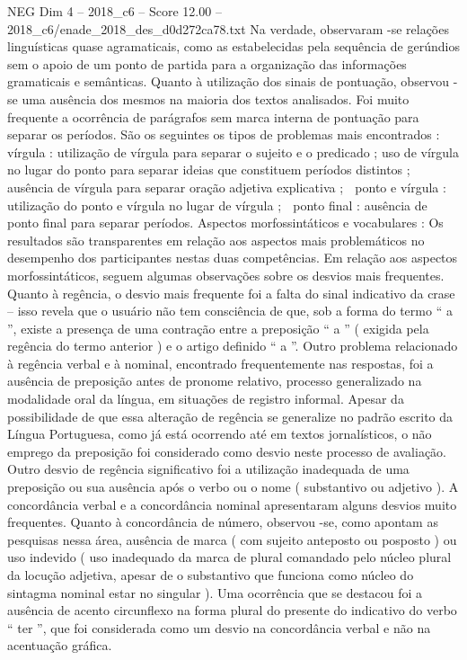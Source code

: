 \begin{textsample}{NEG Dim 4 – 2018\_c6 – Score 12.00 – 2018\_c6/enade\_2018\_des\_d0d272ca78.txt}
Na verdade, observaram -se relações linguísticas quase agramaticais, como as estabelecidas pela sequência de gerúndios sem o apoio de um ponto de partida para a organização das informações gramaticais e semânticas.
Quanto à utilização dos sinais de pontuação, observou -se uma ausência dos mesmos na maioria dos textos analisados.
Foi muito frequente a ocorrência de parágrafos sem marca interna de pontuação para separar os períodos.
São os seguintes os tipos de problemas mais encontrados :  vírgula : utilização de vírgula para separar o sujeito e o predicado ; uso de vírgula no lugar do ponto para separar ideias que constituem períodos distintos ; ausência de vírgula para separar oração adjetiva explicativa ;  ponto e vírgula : utilização do ponto e vírgula no lugar de vírgula ;  ponto final : ausência de ponto final para separar períodos.
Aspectos morfossintáticos e vocabulares : Os resultados são transparentes em relação aos aspectos mais problemáticos no desempenho dos participantes nestas duas competências.
Em relação aos aspectos morfossintáticos, seguem algumas observações sobre os desvios mais frequentes.
Quanto à regência, o desvio mais frequente foi a falta do sinal indicativo da crase – isso revela que o usuário não tem consciência de que, sob a forma do termo “ a ”, existe a presença de uma contração entre a preposição “ a ” ( exigida pela regência do termo anterior ) e o artigo definido “ a ”.
Outro problema relacionado à regência verbal e à nominal, encontrado frequentemente nas respostas, foi a ausência de preposição antes de pronome relativo, processo generalizado na modalidade oral da língua, em situações de registro informal.
Apesar da possibilidade de que essa alteração de regência se generalize no padrão escrito da Língua Portuguesa, como já está ocorrendo até em textos jornalísticos, o não emprego da preposição foi considerado como desvio neste processo de avaliação.
Outro desvio de regência significativo foi a utilização inadequada de uma preposição ou sua ausência após o verbo ou o nome ( substantivo ou adjetivo ).
A concordância verbal e a concordância nominal apresentaram alguns desvios muito frequentes.
Quanto à concordância de número, observou -se, como apontam as pesquisas nessa área, ausência de marca ( com sujeito anteposto ou posposto ) ou uso indevido ( uso inadequado da marca de plural comandado pelo núcleo plural da locução adjetiva, apesar de o substantivo que funciona como núcleo do sintagma nominal estar no singular ).
Uma ocorrência que se destacou foi a ausência de acento circunflexo na forma plural do presente do indicativo do verbo “ ter ”, que foi considerada como um desvio na concordância verbal e não na acentuação gráfica.

\end{textsample}
